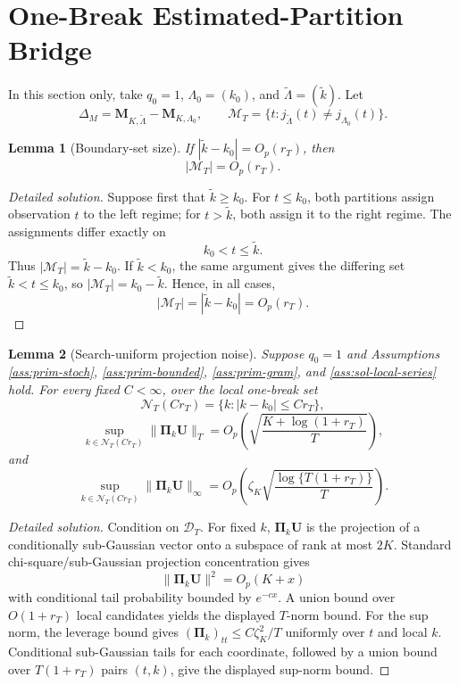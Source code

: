 \documentclass[12pt]{article}
\numberwithin{equation}{section}
\newtheorem{lemma}{Lemma}
\theoremstyle{definition}
\newcommand{\D}{\mathcal D}
\begin{document}
\section{One-Break Estimated-Partition Bridge}
\label{sec:one-break-bridge}

In this section only, take \(q_0=1\), \(\Lambda_0=(k_0)\), and \(\widetilde\Lambda=(\widetilde k)\). Let
\[
    \Delta_M=\bm M_{K,\widetilde\Lambda}-\bm M_{K,\Lambda_0},
    \qquad
    \mathcal M_T=\{t:j_{\widetilde\Lambda}(t)\neq j_{\Lambda_0}(t)\}.
\]

\begin{lemma}[Boundary-set size]
\label{lem:wb-boundary-size}
If \(|\widetilde k-k_0|=O_p(r_T)\), then
\[
    |\mathcal M_T|=O_p(r_T).
\]
\end{lemma}


\begin{proof}[Detailed solution]
Suppose first that \(\widetilde k\geq k_0\).  For \(t\leq k_0\), both
partitions assign observation \(t\) to the left regime; for
\(t>\widetilde k\), both assign it to the right regime.  The assignments
differ exactly on
\[
    k_0<t\leq\widetilde k.
\]
Thus \(|\mathcal M_T|=\widetilde k-k_0\).  If \(\widetilde k<k_0\), the
same argument gives the differing set \(\widetilde k<t\leq k_0\), so
\(|\mathcal M_T|=k_0-\widetilde k\).  Hence, in all cases,
\[
    |\mathcal M_T|=|\widetilde k-k_0|=O_p(r_T).
\]
\end{proof}
\begin{lemma}[Search-uniform projection noise]
\label{lem:wb-uniform-projection-noise}
Suppose \(q_0=1\) and Assumptions \ref{ass:prim-stoch},
\ref{ass:prim-bounded}, \ref{ass:prim-gram}, and \ref{ass:sol-local-series}
hold.  For every fixed \(C<\infty\), over the local one-break set
\[
    \mathcal N_T(Cr_T)=\{k:|k-k_0|\leq Cr_T\},
\]
\[
    \sup_{k\in\mathcal N_T(Cr_T)}\|\bm\Pi_k\bm U\|_T
    =O_p\left(\sqrt{\frac{K+\log(1+r_T)}{T}}\right),
\]
and
\[
    \sup_{k\in\mathcal N_T(Cr_T)}\|\bm\Pi_k\bm U\|_\infty
    =O_p\left(
      \zeta_K\sqrt{\frac{\log\{T(1+r_T)\}}{T}}
    \right).
\]
\end{lemma}

\begin{proof}[Detailed solution]
Condition on \(\D_T\).  For fixed \(k\), \(\bm\Pi_k\bm U\) is the projection
of a conditionally sub-Gaussian vector onto a subspace of rank at most \(2K\).
Standard chi-square/sub-Gaussian projection concentration gives
\[
    \|\bm\Pi_k\bm U\|^2=O_p(K+x)
\]
with conditional tail probability bounded by \(e^{-cx}\).  A union bound over
\(O(1+r_T)\) local candidates yields the displayed \(T\)-norm bound.  For the
sup norm, the leverage bound gives \((\bm\Pi_k)_{tt}\leq C\zeta_K^2/T\)
uniformly over \(t\) and local \(k\).  Conditional sub-Gaussian tails for each
coordinate, followed by a union bound over \(T(1+r_T)\) pairs \((t,k)\), give
the displayed sup-norm bound.
\end{proof}
\end{document}
